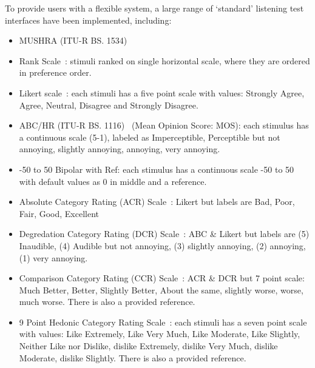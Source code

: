 \documentclass{sig-alternate}
\begin{document}
To provide users with a flexible system, a large range of `standard' listening test interfaces have been implemented, including: %
	\begin{itemize}[noitemsep,nolistsep]
		\item MUSHRA (ITU-R BS. 1534)~\cite{recommendation20031534}

		\item Rank Scale~\cite{pascoe1983evaluation}: stimuli ranked on single horizontal scale, where they are ordered in preference order.
		\item Likert scale~\cite{likert1932technique}: each stimuli has a five point scale with values: Strongly Agree, Agree, Neutral, Disagree and Strongly Disagree.
		\item ABC/HR (ITU-R BS. 1116)~\cite{recommendation19971116} (Mean Opinion Score: MOS): each stimulus has a continuous scale (5-1), labeled as Imperceptible, Perceptible but not annoying, slightly annoying, annoying, very annoying.
		\item -50 to 50 Bipolar with Ref: each stimulus has a continuous scale -50 to 50 with default values as 0 in middle and a reference.
		\item Absolute Category Rating (ACR) Scale~\cite{rec1996p}: Likert but labels are Bad, Poor, Fair, Good, Excellent
		\item Degredation Category Rating (DCR) Scale~\cite{rec1996p}: ABC \& Likert but labels are (5) Inaudible, (4) Audible but not annoying, (3) slightly annoying, (2) annoying, (1) very annoying.
		\item Comparison Category Rating (CCR) Scale~\cite{rec1996p}: ACR \& DCR but 7 point scale: Much Better, Better, Slightly Better, About the same, slightly worse, worse, much worse. There is also a provided reference.
		\item 9 Point Hedonic Category Rating Scale~\cite{peryam1952advanced}: each stimuli has a seven point scale with values: Like Extremely, Like Very Much, Like Moderate, Like Slightly, Neither Like nor Dislike, dislike Extremely, dislike Very Much, dislike Moderate, dislike Slightly. There is also a provided reference.

\end{itemize}
\end{document}
